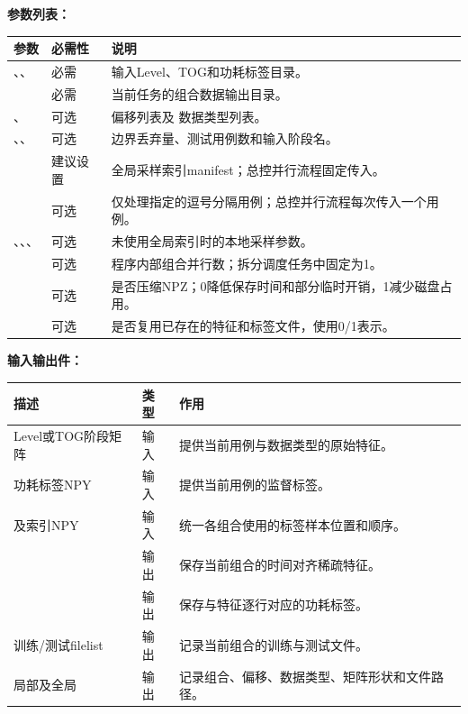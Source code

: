 \textbf{参数列表：}
\begin{longtable}{L{0.31\textwidth}L{0.14\textwidth}L{0.42\textwidth}}
\toprule 参数 & 必需性 & 说明 \\ \midrule
{}、、 & 必需 & 输入Level、TOG和功耗标签目录。 \\
 & 必需 & 当前任务的组合数据输出目录。 \\
、 & 可选 & 偏移列表及  数据类型列表。 \\
、、 & 可选 & 边界丢弃量、测试用例数和输入阶段名。 \\
 & 建议设置 & 全局采样索引manifest；总控并行流程固定传入。 \\
 & 可选 & 仅处理指定的逗号分隔用例；总控并行流程每次传入一个用例。 \\
、、、 & 可选 & 未使用全局索引时的本地采样参数。 \\
 & 可选 & 程序内部组合并行数；拆分调度任务中固定为1。 \\
 & 可选 & 是否压缩NPZ；0降低保存时间和部分临时开销，1减少磁盘占用。 \\
 & 可选 & 是否复用已存在的特征和标签文件，使用0/1表示。 \\
\bottomrule
\end{longtable}

\textbf{输入输出件：}
\begin{longtable}{L{0.34\textwidth}L{0.13\textwidth}L{0.41\textwidth}}
\toprule 描述 & 类型 & 作用 \\ \midrule
Level或TOG阶段矩阵 & 输入 & 提供当前用例与数据类型的原始特征。 \\
功耗标签NPY & 输入 & 提供当前用例的监督标签。 \\
及索引NPY & 输入 & 统一各组合使用的标签样本位置和顺序。 \\
 & 输出 & 保存当前组合的时间对齐稀疏特征。 \\
 & 输出 & 保存与特征逐行对应的功耗标签。 \\
训练/测试filelist & 输出 & 记录当前组合的训练与测试文件。 \\
局部及全局 & 输出 & 记录组合、偏移、数据类型、矩阵形状和文件路径。 \\
\bottomrule
\end{longtable}

